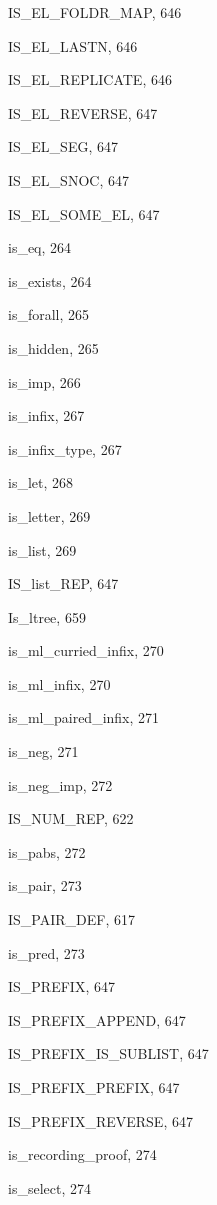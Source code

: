\begin{theindex}
  \item {\ptt IS\_EL\_FOLDR\_MAP}, 646
  \item {\ptt IS\_EL\_LASTN}, 646
  \item {\ptt IS\_EL\_REPLICATE}, 646
  \item {\ptt IS\_EL\_REVERSE}, 647
  \item {\ptt IS\_EL\_SEG}, 647
  \item {\ptt IS\_EL\_SNOC}, 647
  \item {\ptt IS\_EL\_SOME\_EL}, 647
  \item {\ptt is\_eq}, 264
  \item {\ptt is\_exists}, 264
  \item {\ptt is\_forall}, 265
  \item {\ptt is\_hidden}, 265
  \item {\ptt is\_imp}, 266
  \item {\ptt is\_infix}, 267
  \item {\ptt is\_infix\_type}, 267
  \item {\ptt is\_let}, 268
  \item {\ptt is\_letter}, 269
  \item {\ptt is\_list}, 269
  \item {\ptt IS\_list\_REP}, 647
  \item {\ptt Is\_ltree}, 659
  \item {\ptt is\_ml\_curried\_infix}, 270
  \item {\ptt is\_ml\_infix}, 270
  \item {\ptt is\_ml\_paired\_infix}, 271
  \item {\ptt is\_neg}, 271
  \item {\ptt is\_neg\_imp}, 272
  \item {\ptt IS\_NUM\_REP}, 622
  \item {\ptt is\_pabs}, 272
  \item {\ptt is\_pair}, 273
  \item {\ptt IS\_PAIR\_DEF}, 617
  \item {\ptt is\_pred}, 273
  \item {\ptt IS\_PREFIX}, 647
  \item {\ptt IS\_PREFIX\_APPEND}, 647
  \item {\ptt IS\_PREFIX\_IS\_SUBLIST}, 647
  \item {\ptt IS\_PREFIX\_PREFIX}, 647
  \item {\ptt IS\_PREFIX\_REVERSE}, 647
  \item {\ptt is\_recording\_proof}, 274
  \item {\ptt is\_select}, 274

\end{theindex}
